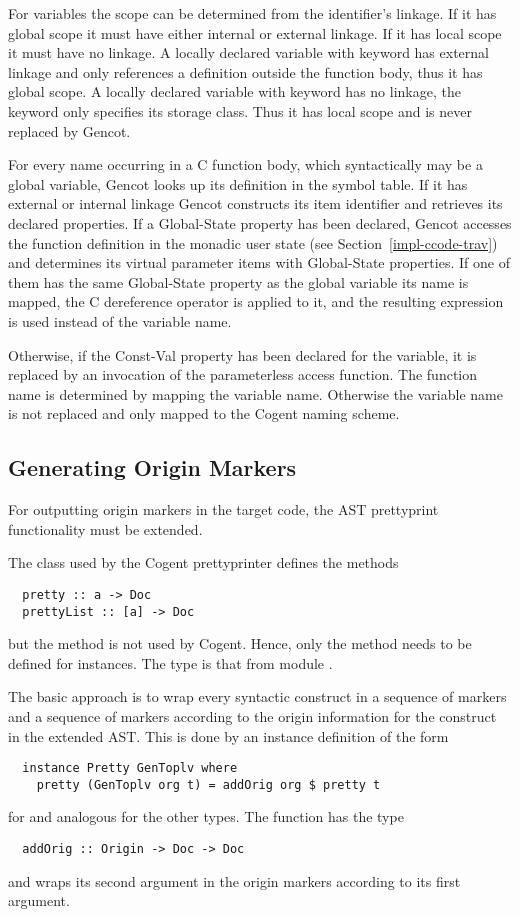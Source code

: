 For variables the scope can be determined from the identifier's linkage.
If it has global scope it must have either internal or external linkage. If it has local scope it must have no
linkage. A locally declared variable with keyword  has external linkage and only references a 
definition outside the function body, thus it has global scope. A locally declared variable 
with keyword  has no linkage, the keyword only specifies its storage class. Thus it has local scope
and is never replaced by Gencot.

For every name occurring in a C function body, which syntactically may be a global variable, Gencot looks up 
its definition in the symbol table. If it has external or internal linkage Gencot constructs its item identifier
and retrieves its declared properties. If a Global-State property has been declared, Gencot accesses the 
function definition in the monadic user state (see Section~\ref{impl-ccode-trav}) and determines its virtual
parameter items with Global-State properties. If one of them has the same Global-State property as the global
variable its name is mapped, the C dereference operator \code{*} is applied to it, and the resulting expression
is used instead of the variable name.

Otherwise, if the Const-Val property has been declared for the variable, it is replaced by an invocation of the 
parameterless access function. The function name is determined by mapping the variable name. Otherwise the 
variable name is not replaced and only mapped to the Cogent naming scheme.

\subsection{Generating Origin Markers}
\label{impl-ccode-origin}

For outputting origin markers in the target code, the AST prettyprint functionality must be extended.

The class  used by the Cogent prettyprinter defines the methods
\begin{verbatim}
  pretty :: a -> Doc
  prettyList :: [a] -> Doc
\end{verbatim}
but the method  is not used by Cogent. Hence, only the method  needs to be defined
for instances. The type  is that from module .

The basic approach is to wrap every syntactic construct in a sequence of  markers and 
a sequence of  markers according to the origin information for the construct in the extended AST. 
This is done by an instance definition of the form
\begin{verbatim}
  instance Pretty GenToplv where
    pretty (GenToplv org t) = addOrig org $ pretty t
\end{verbatim}
for  and analogous for the other types. The function  has the type
\begin{verbatim}
  addOrig :: Origin -> Doc -> Doc
\end{verbatim}
and wraps its second argument in the origin markers according to its first argument.

